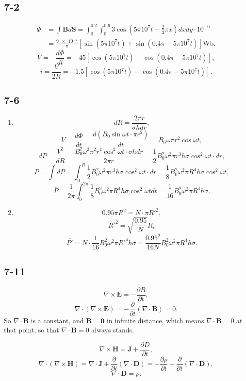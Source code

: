 \documentclass[6pt,a4paper]{article}
\begin{document}
\subsection{7-2}
\begin{align*}
\Phi&=\int\mathbf{B}d\mathbf{S}=\int_0^{0.2}\int_0^{0.6}3\cos\left(5\pi10^7t-\frac{2}{3}\pi x\right)dxdy\cdot10^{-6}\\&=\frac{\num{9e-7}}{\pi}[\sin(5\pi10^7t)+\sin(0.4\pi-5\pi10^7t)]\si{\weber}.
\end{align*}
$$V=-\frac{d\Phi}{dt}=-45[\cos(5\pi10^7t)-\cos(0.4\pi-5\pi10^7t)],$$
$$i=\frac{V}{2R}=-1.5[\cos(5\pi10^7t)-\cos(0.4\pi-5\pi10^7t)].$$

\subsection{7-6}
\begin{enumerate}[label=\alph*)]
\item
$$dR=\frac{2\pi r}{\sigma hdr},$$
$$V=\frac{d\Phi}{dt}=\frac{d(B_0\sin\omega t\cdot \pi r^2)}{dt}=B_0\omega\pi r^2\cos\omega t,$$
$$dP=\frac{V^2}{dR}=\frac{B_0^2\omega^2\pi^2 r^4\cos^2\omega t\cdot\sigma hdr}{2\pi r}=\frac{1}{2}B_0^2\omega^2\pi r^3h\sigma\cos^2\omega t\cdot dr,$$
$$P=\int dP=\int_0^R\frac{1}{2}B_0^2\omega^2\pi r^3h\sigma\cos^2\omega t\cdot dr=\frac{1}{8}B_0^2\omega^2\pi R^4h\sigma\cos^2\omega t,$$
$$\overline{P}=\frac{1}{2\pi}\int_0^{2\pi}\frac{1}{8}B_0^2\omega^2\pi R^4h\sigma\cos^2\omega t dt=\frac{1}{16}B_0^2\omega^2\pi R^4h\sigma.$$
\item
$$0.95\pi R^2=N\cdot \pi R'^2,$$
$$R'^2=\sqrt{\frac{0.95}{N}}R,$$
$$\overline{P'}=N\cdot\frac{1}{16}B_0^2\omega^2\pi R'^4h\sigma=\frac{0.95^2}{16N}B_0^2\omega^2\pi R^4h\sigma.$$
\end{enumerate}

\subsection{7-11}
$$\nabla\times\mathbf{E}=-\frac{\partial B}{\partial t},$$
$$\nabla\cdot(\nabla\times\mathbf{E})=-\frac{\partial}{\partial t}(\nabla\cdot\mathbf{B})=0.$$
So $\nabla\cdot\mathbf{B}$ is a constant, and $\mathbf{B}=\mathbf{0}$ in infinite distance, which means $\nabla\cdot\mathbf{B}=0$ at that point, so that $\nabla\cdot\mathbf{B}=0$ always stands.

$$\nabla\times\mathbf{H}=\mathbf{J}+\frac{\partial D}{\partial t},$$
$$\nabla\cdot(\nabla\times\mathbf{H})=\nabla\cdot\mathbf{J}+\frac{\partial}{\partial t}(\nabla\cdot\mathbf{D})=-\frac{\partial\rho}{\partial t}+\frac{\partial}{\partial t}(\nabla\cdot\mathbf{D}),$$
$$\nabla\cdot\mathbf{D}=\rho.$$
\end{document}
